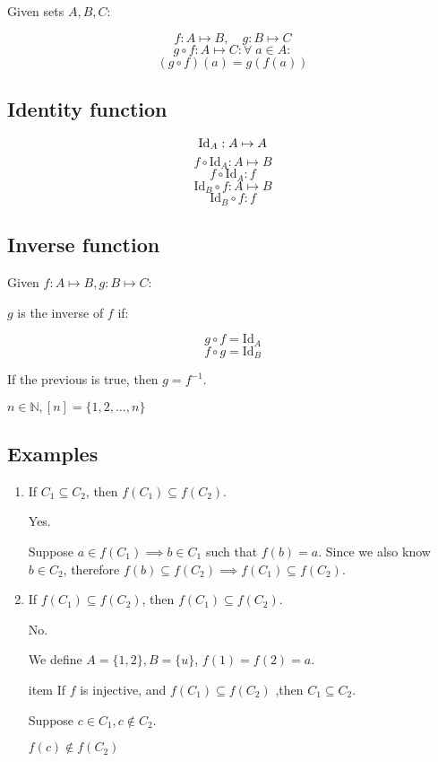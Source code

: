 \documentclass[00_complete]{subfiles}
\begin{document}
Given sets $A, B, C$:

$$f: A \mapsto B, \quad g: B \mapsto C$$
$$g \circ f: A \mapsto C: \forall \; a \in A:$$
$$(g \circ f)(a) = g(f(a))$$

\subsection{Identity function}

$$\operatorname{Id}_A: A \mapsto A$$
$$f \circ \mathrm{Id}_A: A \mapsto B$$
$$f \circ \mathrm{Id}_A: f$$
$$\mathrm{Id}_B \circ f: A \mapsto B$$
$$\mathrm{Id}_B \circ f: f$$

\subsection{Inverse function}

Given $f: A \mapsto B, g: B \mapsto C$:

$g$ is the inverse of $f$ if:

$$g \circ f = \mathrm{Id}_A$$
$$f \circ g = \mathrm{Id}_B$$

If the previous is true, then $g = f^{-1}$.

$n \in \mathbb{N}, [n] = \{1,2,\ldots, n\}$
\subsection{Examples}
\begin{example}
\begin{enumerate}
Given $f:A \mapsto B$, $C_1, C_2 \subseteq A$
\item If $C_1 \subseteq C_2$, then $f(C_1) \subseteq f(C_2)$.

Yes.

Suppose $a \in f(C_1) \implies b \in C_1$ such that $f(b)=a$. Since we also
know $b \in C_2$, therefore $f(b) \subseteq f(C_2) \implies f(C_1) \subseteq f(C_2)$.

\item If $f(C_1) \subseteq f(C_2)$, then $f(C_1) \subseteq f(C_2)$.

No.

We define $A=\{1,2\}, B=\{u\}$, $f(1)=f(2)=a$.

item If $f$ is injective, and $f(C_1) \subseteq f(C_2)$ ,then $C_1 \subseteq
C_2$.

Suppose $c \in C_1, c \notin C_2$.

$f(c) \notin f(C_2)$
\end{enumerate}
\end{example}
\end{document}
